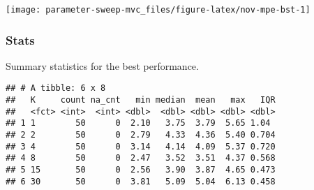 \documentclass[]{book}
\newenvironment{Shaded}{\begin{snugshade}}{\end{snugshade}}
\newcommand{\DataTypeTok}[1]{\textcolor[rgb]{0.13,0.29,0.53}{#1}}
\newcommand{\KeywordTok}[1]{\textcolor[rgb]{0.13,0.29,0.53}{\textbf{#1}}}
\newcommand{\NormalTok}[1]{#1}
\newcommand{\OperatorTok}[1]{\textcolor[rgb]{0.81,0.36,0.00}{\textbf{#1}}}
\newcommand{\OtherTok}[1]{\textcolor[rgb]{0.56,0.35,0.01}{#1}}
\newcommand{\StringTok}[1]{\textcolor[rgb]{0.31,0.60,0.02}{#1}}
\begin{document}
\texttt{[image: parameter-sweep-mvc\_files/figure-latex/nov-mpe-bst-1]}

\hypertarget{stats-58}{%
\subsubsection{Stats}\label{stats-58}}

Summary statistics for the best performance.

\begin{Shaded}
\end{Shaded}

\begin{verbatim}
## # A tibble: 6 x 8
##   K     count na_cnt   min median  mean   max   IQR
##   <fct> <int>  <int> <dbl>  <dbl> <dbl> <dbl> <dbl>
## 1 1        50      0  2.10   3.75  3.79  5.65 1.04 
## 2 2        50      0  2.79   4.33  4.36  5.40 0.704
## 3 4        50      0  3.14   4.14  4.09  5.37 0.720
## 4 8        50      0  2.47   3.52  3.51  4.37 0.568
## 5 15       50      0  2.56   3.90  3.87  4.65 0.473
## 6 30       50      0  3.81   5.09  5.04  6.13 0.458
\end{verbatim}
\end{document}
